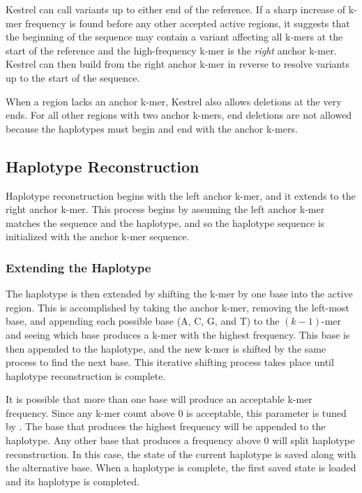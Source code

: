 Kestrel can call variants up to either end of the reference. If a sharp increase of k-mer frequency is found before any other accepted active regions, it suggests that the beginning of the sequence may contain a variant affecting all k-mers at the start of the reference and the high-frequency k-mer is the \textit{right} anchor k-mer. Kestrel can then build from the right anchor k-mer in reverse to resolve variants up to the start of the sequence.

When a region lacks an anchor k-mer, Kestrel also allows deletions at the very ends. For all other regions with two anchor k-mers, end deletions are not allowed because the haplotypes must begin and end with the anchor k-mers.

\subsection{Haplotype Reconstruction}
\label{sec.process.haplo}

Haplotype reconstruction begins with the left anchor k-mer, and it extends to the right anchor k-mer. This process begins by assuming the left anchor k-mer matches the sequence and the haplotype, and so the haplotype sequence is initialized with the anchor k-mer sequence.

\subsubsection{Extending the Haplotype}
\label{sec.process.haplo.extend}

The haplotype is then extended by shifting the k-mer by one base into the active region. This is accomplished by taking the anchor k-mer, removing the left-most base, and appending each possible base (A, C, G, and T) to the $(k - 1)$-mer and seeing which base produces a k-mer with the highest frequency. This base is then appended to the haplotype, and the new k-mer is shifted by the same process to find the next base. This iterative shifting process takes place until haplotype reconstruction is complete.

It is possible that more than one base will produce an acceptable k-mer frequency. Since any k-mer count above $0$ is acceptable, this parameter is tuned by . The base that produces the highest frequency will be appended to the haplotype. Any other base that produces a frequency above $0$ will split haplotype reconstruction. In this case, the state of the current haplotype is saved along with the alternative base. When a haplotype is complete, the first saved state is loaded and its haplotype is completed.

